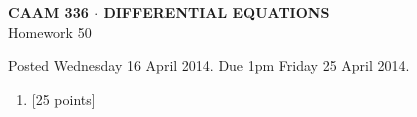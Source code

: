 \documentclass[10pt]{article}
\begin{document}
\vspace*{-5em}
\begin{center}
\large \textsf{\textbf{CAAM 336 $\cdot$ DIFFERENTIAL EQUATIONS}\\[0.5em]
Homework 50 }
\end{center}

Posted Wednesday 16 April 2014.  Due 1pm Friday 25 April 2014.

\begin{enumerate}\addtocounter{enumi}{49}
\item {[25 points]}  
\end{enumerate}
\end{document}
